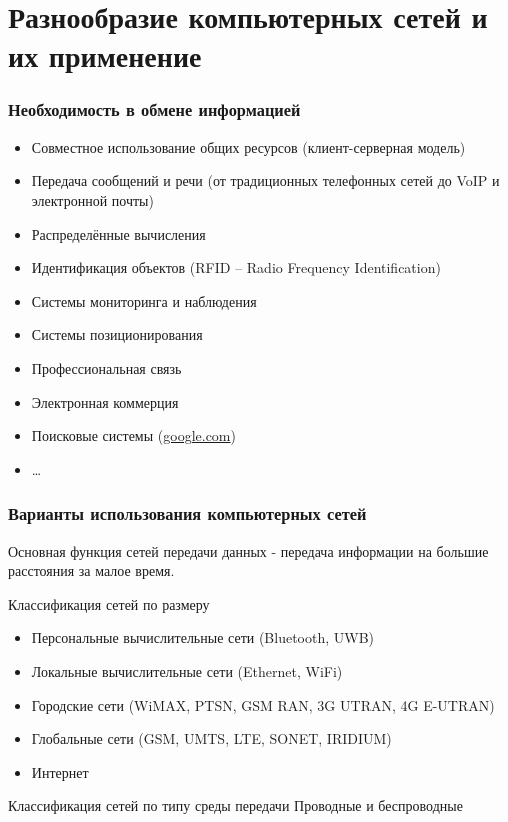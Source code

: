 \documentclass[utf8]{beamer}
\begin{document}
\section{Разнообразие компьютерных сетей и их применение}
\begin{frame}
\frametitle{Необходимость в обмене информацией}
\begin{itemize}
 \item Совместное использование общих ресурсов (клиент-серверная модель)
 \item Передача сообщений и речи (от традиционных телефонных сетей до VoIP и электронной почты)
 \item Распределённые вычисления
 \item Идентификация объектов (RFID -- Radio Frequency Identification)
 \item Системы мониторинга и наблюдения
 \item Системы позиционирования
 \item Профессиональная связь
 \item Электронная коммерция
 \item Поисковые системы (\url{google.com})
 \item \ldots
\end{itemize}
\end{frame}
\begin{frame}
\frametitle{Варианты использования компьютерных сетей}
Основная функция сетей передачи данных - передача информации на большие расстояния за малое время.
\begin{block}{Классификация сетей по размеру}
\begin{itemize}
 \item Персональные вычислительные сети (Bluetooth, UWB)
 \item Локальные вычислительные сети (Ethernet, WiFi)
 \item Городские сети (WiMAX, PTSN, GSM RAN, 3G UTRAN, 4G E-UTRAN)
 \item Глобальные сети (GSM, UMTS, LTE, SONET, IRIDIUM)
 \item Интернет
\end{itemize}
\end{block}
\begin{block}{Классификация сетей по типу среды передачи}
 Проводные и беспроводные
\end{block}
\end{frame}
\end{document}
